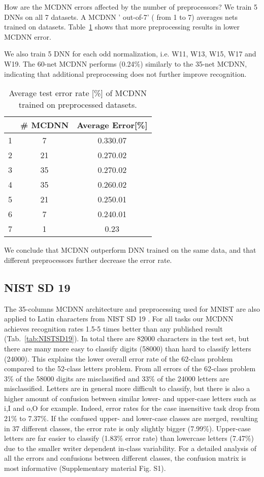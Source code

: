 \documentclass[a4paper]{article}
\begin{document}
How are the MCDNN errors affected by the number of preprocessors? We train 5 DNNs on all 7 datasets. A MCDNN ' out-of-7' ( from 1 to 7) averages  nets trained on  datasets. Table~\ref{tab:MNISTpreprocessings} shows that more preprocessing results in lower MCDNN error.

We also train 5 DNN for each odd normalization, i.e. W11, W13, W15, W17 and W19. The 60-net MCDNN performs (0.24\%) similarly to the 35-net MCDNN, indicating that additional preprocessing does not further improve recognition.

\begin{table}[h!]
	\caption{Average test error rate [\%] of MCDNN trained on  preprocessed datasets.}
	\small
	\centering
  \begin{tabular}{cc|c}
		& 	\# MCDNN		&	Average Error[\%]\\
	\hline
	1	&	7			&	0.330.07\\
	2	&	21			&	0.270.02\\
	3	&	35			&	0.270.02\\
	4	&	35			&	0.260.02\\
	5	&	21			&	0.250.01\\
	6	&	7			&	0.240.01\\
	7	&	1			&	0.23\\
  \end{tabular}
  	\label{tab:MNISTpreprocessings}
\end{table}


We conclude that MCDNN outperform DNN trained on the same data, and that different preprocessors further decrease the error rate.

\subsection{NIST SD 19}

The 35-columns MCDNN architecture and preprocessing used for MNIST are also applied to Latin characters from NIST SD 19 \cite{NIST}. For all tasks our MCDNN achieves recognition rates 1.5-5 times better than any published result (Tab.~\ref{tab:NISTSD19}). In total there are 82000 characters in the test set, but there are many more easy to classify digits (58000) than hard to classify letters (24000). This explains the lower overall error rate of the 62-class problem compared to the 52-class letters problem. From all errors of the 62-class problem 3\% of the 58000 digits are misclassified and 33\% of the 24000 letters are misclassified. Letters are in general more difficult to classify, but there is also a higher amount of confusion between similar lower- and upper-case letters such as i,I and o,O for example. Indeed, error rates for the case insensitive task drop from 21\% to 7.37\%. If the confused upper- and lower-case classes are merged, resulting in 37 different classes, the error rate is only slightly bigger (7.99\%). Upper-case letters are far easier to classify (1.83\% error rate) than lowercase letters (7.47\%) due to the smaller writer dependent in-class variability. For a detailed analysis of all the errors and confusions between different classes, the confusion matrix is most informative (Supplementary material Fig. S1).
\end{document}
